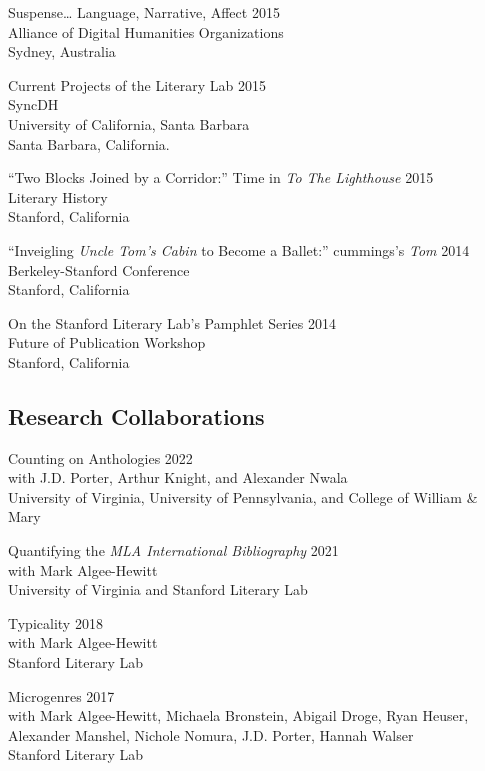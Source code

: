 \documentclass[
  12pt,
  letterpaper,
]{article}
\begin{document}
Suspense\ldots{} Language, Narrative, Affect \hfill 2015\\
Alliance of Digital Humanities Organizations\\
Sydney, Australia

Current Projects of the Literary Lab \hfill 2015\\
SyncDH\\
University of California, Santa Barbara\\
Santa Barbara, California.

``Two Blocks Joined by a Corridor:'' Time in \emph{To The Lighthouse} \hfill 2015\\
Literary History\\
Stanford, California

``Inveigling \emph{Uncle Tom's Cabin} to Become a Ballet:'' cummings's
\emph{Tom} \hfill 2014\\
Berkeley-Stanford Conference\\
Stanford, California

On the Stanford Literary Lab's Pamphlet Series \hfill 2014\\
Future of Publication Workshop\\
Stanford, California

\hypertarget{research-collaborations}{%
\subsection{Research Collaborations}\label{research-collaborations}}

Counting on Anthologies \hfill 2022\\
with J.D. Porter, Arthur Knight, and Alexander Nwala\\
University of Virginia, University of Pennsylvania, and College of William \& Mary

Quantifying the \emph{MLA International Bibliography} \hfill 2021\\
with Mark Algee-Hewitt\\
University of Virginia and Stanford Literary Lab

Typicality \hfill 2018\\
with Mark Algee-Hewitt\\
Stanford Literary Lab

Microgenres \hfill 2017\\
with Mark Algee-Hewitt, Michaela Bronstein, Abigail
Droge, Ryan Heuser,\\
Alexander Manshel, Nichole Nomura, J.D. Porter, Hannah
Walser\\
Stanford Literary Lab
\end{document}
